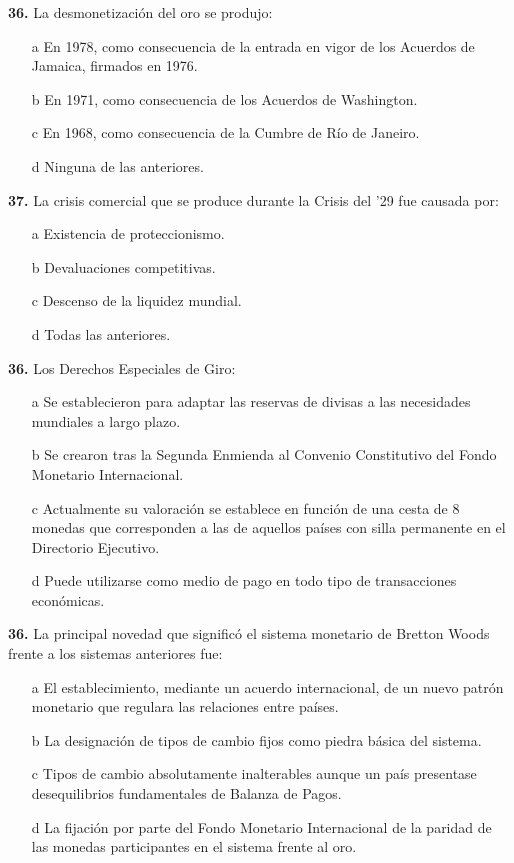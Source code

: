 \documentclass{nuevotema}
\begin{document}

\textbf{36.} La desmonetización del oro se produjo:
\begin{itemize}
	\item[a] En 1978, como consecuencia de la entrada en vigor de los Acuerdos de Jamaica, firmados en 1976.
	\item[b] En 1971, como consecuencia de los Acuerdos de Washington.
	\item[c] En 1968, como consecuencia de la Cumbre de Río de Janeiro.
	\item[d] Ninguna de las anteriores.
\end{itemize}

\textbf{37.} La crisis comercial que se produce durante la Crisis del '29 fue causada por:
\begin{itemize}
	\item[a] Existencia de proteccionismo.
	\item[b] Devaluaciones competitivas.
	\item[c] Descenso de la liquidez mundial.
	\item[d] Todas las anteriores.
\end{itemize}


\textbf{36.} Los Derechos Especiales de Giro:
\begin{itemize}
	\item[a] Se establecieron para adaptar las reservas de divisas a las necesidades mundiales a largo plazo.
	\item[b] Se crearon tras la Segunda Enmienda al Convenio Constitutivo del Fondo Monetario Internacional.
	\item[c] Actualmente su valoración se establece en función de una cesta de 8 monedas que corresponden a las de aquellos países con silla permanente en el Directorio Ejecutivo.
	\item[d] Puede utilizarse como medio de pago en todo tipo de transacciones económicas.
\end{itemize}


\textbf{36.} La principal novedad que significó el sistema monetario de Bretton Woods frente a los sistemas anteriores fue:
\begin{itemize}
	\item[a] El establecimiento, mediante un acuerdo internacional, de un nuevo patrón monetario que regulara las relaciones entre países.
	\item[b] La designación de tipos de cambio fijos como piedra básica del sistema.
	\item[c] Tipos de cambio absolutamente inalterables aunque un país presentase desequilibrios fundamentales de Balanza de Pagos.
	\item[d] La fijación por parte del Fondo Monetario Internacional de la paridad de las monedas participantes en el sistema frente al oro.
\end{itemize}
\end{document}
